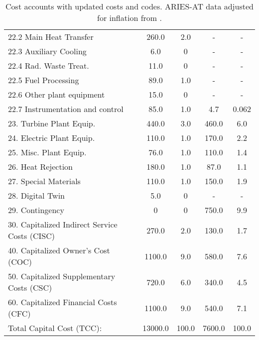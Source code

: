 \begin{table}[h!]
{\begin{tabular}{lcccc}
\hspace{10mm}22.2 Main Heat Transfer & 260.0 & 2.0 & - & - \\
\hspace{10mm}22.3 Auxiliary Cooling & 6.0 & 0 & - & - \\
\hspace{10mm}22.4 Rad. Waste Treat. & 11.0 & 0 & - & - \\
\hspace{10mm}22.5 Fuel Processing & 89.0 & 1.0 & - & - \\
\hspace{10mm}22.6 Other plant equipment & 15.0 & 0 & - & - \\
\hspace{10mm}22.7 Instrumentation and control & 85.0 & 1.0 & 4.7 & 0.062 \\
\hspace{5mm}23. Turbine Plant Equip. & 440.0 & 3.0 & 460.0 & 6.0 \\
\hspace{5mm}24. Electric Plant Equip. & 110.0 & 1.0 & 170.0 & 2.2 \\
\hspace{5mm}25. Misc. Plant Equip. & 76.0 & 1.0 & 110.0 & 1.4 \\
\hspace{5mm}26. Heat Rejection & 180.0 & 1.0 & 87.0 & 1.1 \\
\hspace{5mm}27. Special Materials & 110.0 & 1.0 & 150.0 & 1.9 \\
\hspace{5mm}28. Digital Twin & 5.0 & 0 & - & - \\
\hspace{5mm}29. Contingency & 0 & 0 & 750.0 & 9.9 \\
30. Capitalized Indirect Service Costs (CISC) & 270.0 & 2.0 & 130.0 & 1.7 \\
40. Capitalized Owner’s Cost (COC) & 1100.0 & 9.0 & 580.0 & 7.6 \\
50. Capitalized Supplementary Costs (CSC) & 720.0 & 6.0 & 340.0 & 4.5 \\
60. Capitalized Financial Costs (CFC) & 1100.0 & 9.0 & 540.0 & 7.1 \\
\hline
Total Capital Cost (TCC): & 13000.0 & 100.0 & 7600.0 & 100.0 \\
\hline
\end{tabular}
}
\caption{Cost accounts with updated costs and codes. ARIES-AT data adjusted for inflation from \cite{gordon1986mirror}.}
\label{tab:costs_updated_codes}
\end{table}


